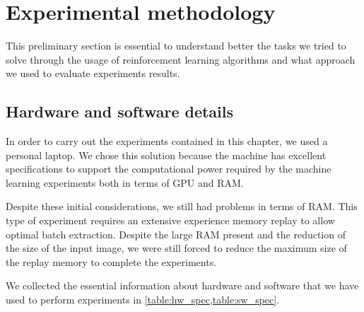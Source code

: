 \section{Experimental methodology}

This preliminary section is essential to understand better the tasks we tried to solve through the usage of reinforcement learning algorithms and what approach we used to evaluate experiments results.

\subsection{Hardware and software details}

In order to carry out the experiments contained in this chapter, we used a personal laptop.
We chose this solution because the machine has excellent specifications to support the computational power required by the machine learning experiments both in terms of GPU and RAM.

Despite these initial considerations, we still had problems in terms of RAM.
This type of experiment requires an extensive experience memory replay to allow optimal batch extraction.
Despite the large RAM present and the reduction of the size of the input image, we were still forced to reduce the maximum size of the replay memory to complete the experiments.

We collected the essential information about hardware and software that we have used to perform experiments in \vref{table:hw_spec,table:sw_spec}.

